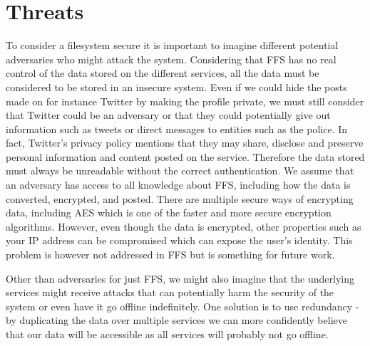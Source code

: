 \section{Threats}
To consider a filesystem secure it is important to imagine different potential adversaries who might attack the system. Considering that FFS has no real control of the data stored on the different services, all the data must be considered to be stored in an insecure system. Even if we could hide the posts made on for instance Twitter by making the profile private, we must still consider that Twitter could be an adversary or that they could potentially give out information such as tweets or direct messages to entities such as the police. In fact, Twitter's privacy policy mentions that they may share, disclose and preserve personal information and content posted on the service\cite{TwitterPrivacyPolicy}. Therefore the data stored must always be unreadable without the correct authentication. We assume that an adversary has access to all knowledge about FFS, including how the data is converted, encrypted, and posted. There are multiple secure ways of encrypting data, including AES which is one of the faster and more secure encryption algorithms\cite{mahajanStudyEncryptionAlgorithms2013}. However, even though the data is encrypted, other properties such as your IP address can be compromised which can expose the user's identity. This problem is however not addressed in FFS but is something for future work.

Other than adversaries for just FFS, we might also imagine that the underlying services might receive attacks that can potentially harm the security of the system or even have it go offline indefinitely. One solution is to use redundancy - by duplicating the data over multiple services we can more confidently believe that our data will be accessible as all services will probably not go offline. 

